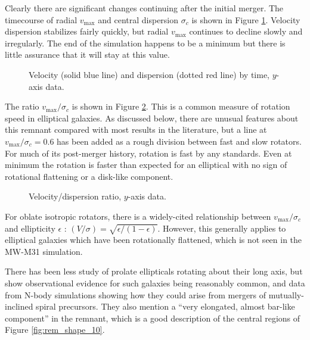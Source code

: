 \documentclass[twocolumn]{aastex63}
\begin{document}
Clearly there are significant changes continuing after the initial merger. The timecourse of radial $v_{\text{max}}$ and central dispersion $\sigma_c$ is shown in Figure \ref{fig:rem_st_vdisp_tc}. Velocity dispersion stabilizes fairly quickly, but radial $v_{\text{max}}$ continues to decline slowly and irregularly. The end of the simulation happens to be a minimum but there is little assurance that it will stay at this value.

\begin{figure}[htb!]
	\caption{Velocity (solid blue line) and dispersion (dotted red line) by time, $y$-axis data.
		\label{fig:rem_st_vdisp_tc}}
\end{figure}

The ratio $v_{\text{max}} / \sigma_c$ is shown in Figure \ref{fig:rem_st_vdisp_ratio}. This is a common measure of rotation speed in elliptical galaxies. As discussed below, there are unusual features about this remnant compared with most results in the literature, but a line at $v_{\text{max}} / \sigma_c = 0.6$ has been added as a rough division between fast and slow rotators. For much of its post-merger history, rotation is fast by any standards. Even at minimum the rotation is faster than expected for an elliptical with no sign of rotational flattening or a disk-like component.

\begin{figure}[htb!]
	\caption{Velocity/dispersion ratio, $y$-axis data.
		\label{fig:rem_st_vdisp_ratio}}
\end{figure}


For oblate isotropic rotators, there is a widely-cited relationship between $v_{\text{max}} / \sigma_c$ and ellipticity $\epsilon$ \citep{binney_rotation_1978}: $(V/\sigma) = \sqrt{\epsilon / (1 - \epsilon)}$. However, this generally applies to elliptical galaxies which have been rotationally flattened, which is not seen in the MW-M31 simulation.

There has been less study of prolate ellipticals rotating about their long axis, but \citet{tsatsi_califa_2017} show observational evidence for such galaxies being reasonably common, and data from N-body simulations showing how they could arise from mergers of mutually-inclined spiral precursors. They also mention a ``very elongated, almost bar-like component'' in the remnant, which is a good description of the central regions of Figure \ref{fig:rem_shape_10}.
\end{document}
